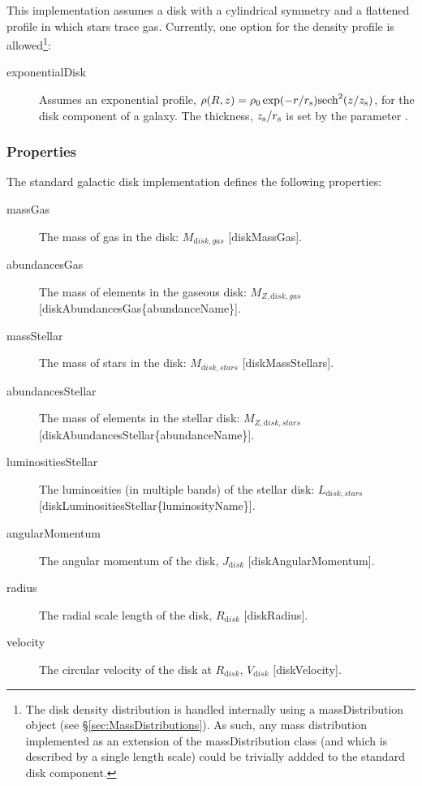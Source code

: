 This implementation assumes a disk with a cylindrical symmetry and a flattened profile in which stars trace gas. Currently, one option for the density profile is allowed\footnote{The disk density distribution is handled internally using a {\normalfont \ttfamily massDistribution} object (see \S\ref{sec:MassDistributions}). As such, any mass distribution implemented as an extension of the {\normalfont \ttfamily massDistribution} class (and which is described by a single length scale) could be trivially addded to the standard disk component.}:
\begin{description}
\item [{\normalfont \ttfamily exponentialDisk}] Assumes an exponential profile, $\rho(R,z) = \rho_0 \exp(-r/r_{\rm s}) \hbox{sech}^2(z/z_{\rm s})$, for the disk \gls{component} of a galaxy. The thickness, $z_{\rm s}/r_{\rm s}$ is set by the parameter {\normalfont \ttfamily [heightToRadialScaleDisk]}.
\end{description}

\subsubsection{Properties}

The standard galactic disk implementation defines the following properties:
\begin{description}
 \item [{\normalfont \ttfamily massGas}] The mass of gas in the disk: $M_{\mathrm disk, gas}$ [{\normalfont \ttfamily diskMassGas}].
 \item [{\normalfont \ttfamily abundancesGas}] The mass of elements in the gaseous disk: $M_{Z, {\mathrm disk, gas}}$ [{\normalfont \ttfamily diskAbundancesGas\{abundanceName\}}].
 \item [{\normalfont \ttfamily massStellar}] The mass of stars in the disk: $M_{\mathrm disk, stars}$ [{\normalfont \ttfamily diskMassStellars}].
 \item [{\normalfont \ttfamily abundancesStellar}] The mass of elements in the stellar disk: $M_{Z, {\mathrm disk, stars}}$ [{\normalfont \ttfamily diskAbundancesStellar\{abundanceName\}}].
 \item [{\normalfont \ttfamily luminositiesStellar}] The luminosities (in multiple bands) of the stellar disk: $L_{\mathrm disk, stars}$ [{\normalfont \ttfamily diskLuminositiesStellar\{luminosityName\}}].
 \item [{\normalfont \ttfamily angularMomentum}] The angular momentum of the disk, $J_{\mathrm disk}$ [{\normalfont \ttfamily diskAngularMomentum}].
 \item [{\normalfont \ttfamily radius}] The radial scale length of the disk, $R_{\mathrm disk}$ [{\normalfont \ttfamily diskRadius}].
 \item [{\normalfont \ttfamily velocity}] The circular velocity of the disk at $R_{\mathrm disk}$, $V_{\mathrm disk}$ [{\normalfont \ttfamily diskVelocity}].
\end{description}

